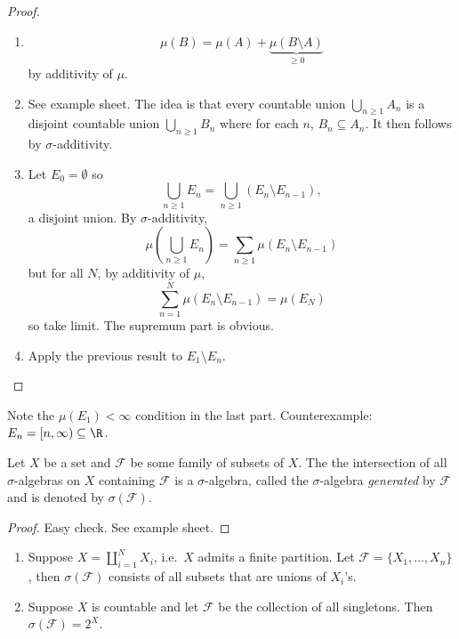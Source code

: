 \documentclass[a4paper]{article}
\begin{document}
\begin{proof}\leavevmode
  \begin{enumerate}
  \item
    \[
      \mu(B) = \mu(A) + \underbrace{\mu(B \setminus A)}_{\geq 0}
    \]
    by additivity of \(\mu\).
  \item See example sheet. The idea is that every countable union \(\bigcup_{n \geq 1} A_n\) is a disjoint countable union \(\bigcup_{n \geq 1} B_n\) where for each \(n\), \(B_n \subseteq A_n\). It then follows by \(\sigma\)-additivity.
  \item Let \(E_0 = \emptyset\) so
    \[
      \bigcup_{n \geq 1} E_n = \bigcup_{n \geq 1} (E_n \setminus E_{n - 1}),
    \]
    a disjoint union. By \(\sigma\)-additivity,
    \[
      \mu(\bigcup_{n \geq 1} E_n) = \sum_{n \geq 1} \mu(E_n \setminus E_{n - 1})
    \]
    but for all \(N\), by additivity of \(\mu\),
    \[
      \sum_{n = 1}^N \mu(E_n \setminus E_{n - 1}) = \mu(E_N)
    \]
    so take limit. The supremum part is obvious.
  \item Apply the previous result to \(E_1 \setminus E_n\).
  \end{enumerate}
\end{proof}

\begin{remark}
  Note the \(\mu(E_1) < \infty\) condition in the last part. Counterexample: \(E_n = [n, \infty) \subseteq \R\).
\end{remark}

\begin{definition}
  Let \(X\) be a set and \(\mathcal F\) be some family of subsets of \(X\). The the intersection of all \(\sigma\)-algebras on \(X\) containing \(\mathcal F\) is a \(\sigma\)-algebra, called the \(\sigma\)-algebra \emph{generated} by \(\mathcal F\) and is denoted by \(\sigma(\mathcal F)\).
\end{definition}

\begin{proof}
  Easy check. See example sheet.
\end{proof}

\begin{eg}\leavevmode
  \begin{enumerate}
  \item Suppose \(X = \coprod_{i = 1}^N X_i\), i.e.\ \(X\) admits a finite partition. Let \(\mathcal F = \{X_1, \dots, X_n\}\), then \(\sigma(\mathcal F)\) consists of all subsets that are unions of \(X_i\)'s.
  \item Suppose \(X\) is countable and let \(\mathcal F\) be the collection of all singletons. Then \(\sigma(\mathcal F) = 2^X\).
  \end{enumerate}
\end{eg}
\end{document}
